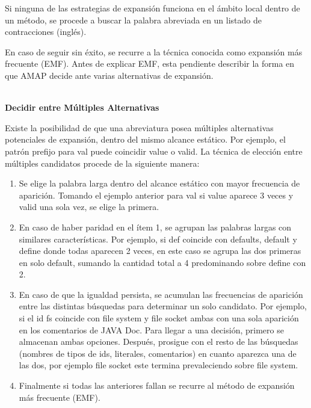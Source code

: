 Si ninguna de las estrategias de expansión funciona en el ámbito local dentro de un método, se procede a buscar la palabra abreviada en un listado de contracciones (inglés).

En caso de seguir sin éxito, se recurre a la técnica conocida como expansión más frecuente (EMF).
Antes de explicar EMF, esta pendiente describir la forma en que AMAP decide ante varias alternativas de expansión.

\noindent \textbf{\\Decidir entre Múltiples Alternativas\\}

Existe la posibilidad de que una abreviatura posea múltiples alternativas potenciales de expansión, dentro del mismo alcance estático. Por ejemplo, el patrón prefijo para \textsf{val} puede coincidir \textsf{value} o \textsf{valid}. La técnica de elección entre múltiples candidatos procede de la siguiente manera:

\begin{enumerate}
\itemsep0em%
\item Se elige la palabra larga dentro del alcance estático con mayor frecuencia de aparición. Tomando el ejemplo anterior para \textsf{val} si \textsf{value} aparece 3 veces y \textsf{valid} una sola vez, se elige la primera.

\item En caso de haber paridad en el ítem 1, se agrupan las palabras largas con similares características. Por ejemplo, si \textsf{def} coincide con \textsf{defaults}, \textsf{default} y \textsf{define} donde todas aparecen 2 veces, en este caso se agrupa las dos primeras en solo \textsf{default}, sumando la cantidad total a 4 predominando sobre \textsf{define} con 2.

\item En caso de que la igualdad persista, se acumulan las frecuencias de aparición entre las distintas búsquedas para determinar un solo candidato. Por ejemplo, si el id \textsf{fs} coincide con \textsf{file system} y \textsf{file socket} ambas con una sola aparición en los comentarios de JAVA Doc. Para llegar a una decisión, primero se almacenan ambas opciones. Después, prosigue con el resto de las búsquedas (nombres de tipos de ids, literales, comentarios) en cuanto aparezca una de las dos, por ejemplo \textsf{file socket} este termina prevaleciendo sobre \textsf{file system}.

\item Finalmente si todas las anteriores fallan se recurre al método de expansión más frecuente (EMF). 

\end{enumerate}


